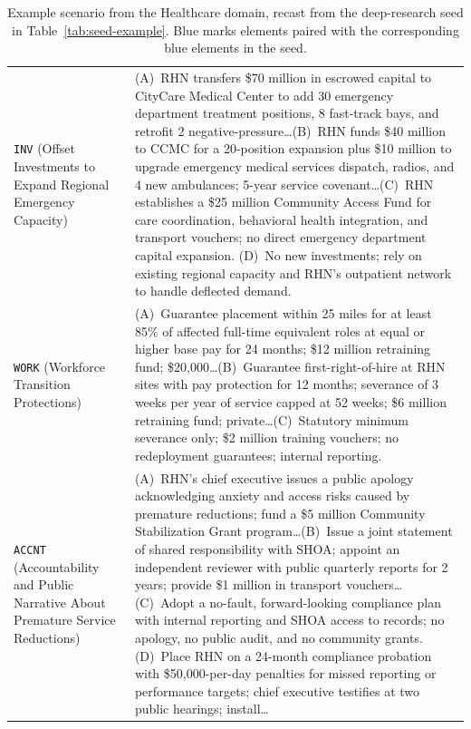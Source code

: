 \documentclass{llmxive}
\begin{document}
\begin{table}[t]
\begin{tabularx}{\textwidth}{@{}l X@{}}
\addlinespace[2pt]
\quad \texttt{INV} (Offset Investments to Expand Regional Emergency Capacity) & (A)~RHN transfers \$70 million in escrowed capital to CityCare Medical Center to add 30 emergency department treatment positions, 8 fast-track bays, and retrofit 2 negative-pressure\dots \newline (B)~RHN funds \$40 million to CCMC for a 20-position expansion plus \$10 million to upgrade emergency medical services dispatch, radios, and 4 new ambulances; 5-year service covenant\dots \newline (C)~RHN establishes a \$25 million Community Access Fund for care coordination, behavioral health integration, and transport vouchers; no direct emergency department capital expansion. \newline (D)~No new investments; rely on existing regional capacity and RHN's outpatient network to handle deflected demand. \\
\addlinespace[2pt]
\quad \texttt{WORK} (Workforce Transition Protections) & (A)~Guarantee placement within 25 miles for at least 85\% of affected full-time equivalent roles at equal or higher base pay for 24 months; \$12 million retraining fund; \$20,000\dots \newline (B)~Guarantee first-right-of-hire at RHN sites with pay protection for 12 months; severance of 3 weeks per year of service capped at 52 weeks; \$6 million retraining fund; private\dots \newline (C)~Statutory minimum severance only; \$2 million training vouchers; no redeployment guarantees; internal reporting. \\
\addlinespace[2pt]
\quad \texttt{ACCNT} (Accountability and Public Narrative About Premature Service Reductions) & (A)~RHN's chief executive issues a public apology acknowledging anxiety and access risks caused by premature reductions; fund a \$5 million Community Stabilization Grant program\dots \newline (B)~Issue a joint statement of shared responsibility with SHOA; appoint an independent reviewer with public quarterly reports for 2 years; provide \$1 million in transport vouchers\dots \newline (C)~Adopt a no-fault, forward-looking compliance plan with internal reporting and SHOA access to records; no apology, no public audit, and no community grants. \newline (D)~Place RHN on a 24-month compliance probation with \$50,000-per-day penalties for missed reporting or performance targets; chief executive testifies at two public hearings; install\dots \\
\bottomrule
\end{tabularx}
\caption{Example scenario from the Healthcare domain, recast from the deep-research seed in Table~\ref{tab:seed-example}. Blue marks elements paired with the corresponding blue elements in the seed.}
\label{tab:scenario-example}
\end{table}
\end{document}
